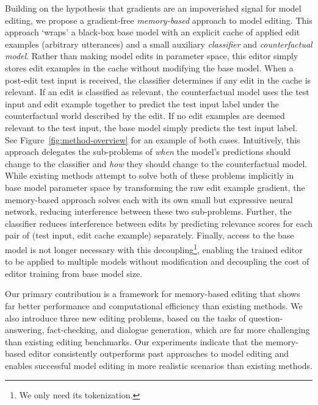 Building on the hypothesis that gradients are an impoverished signal for model editing, we propose a gradient-free \textit{memory-based} approach to model editing. This approach `wraps' a black-box base model with an explicit cache of applied edit examples
(arbitrary utterances)
and a small auxiliary \textit{classifier} and \textit{counterfactual model}. Rather than making model edits in parameter space, this editor simply stores edit examples in the cache without modifying the base model. When a post-edit test input is received, the classifier determines if any edit in the cache is relevant. If an edit is classified as relevant, the counterfactual model uses the test input and edit example together to predict the test input label under the counterfactual world described by the edit. If no edit examples are deemed relevant to the test input, the base model simply predicts the test input label. See Figure~\ref{fig:method-overview} for an example of both cases. Intuitively, this approach delegates the sub-problems of \textit{when} the model's predictions should change to the classifier and \textit{how} they should change to the counterfactual model. While existing methods attempt to solve both of these problems implicitly in base model parameter space by transforming the raw edit example gradient, the memory-based approach solves each with its own small but expressive neural network, reducing interference between these two sub-problems. Further, the classifier reduces interference between edits by predicting relevance scores for each pair of (test input, edit cache example) separately. Finally, access to the base model is not longer necessary with this decoupling\footnote{We only need its tokenization.}, enabling the trained editor to be applied to multiple models without modification and decoupling the cost of editor training from base model size.

Our primary contribution is a framework for memory-based editing that shows far better performance and computational efficiency than existing methods. We also introduce three new editing problems, based on the tasks of question-answering, fact-checking, and dialogue generation, which are far more challenging than existing editing benchmarks. Our experiments indicate that the memory-based editor consistently outperforms past approaches to model editing and enables successful model editing in more realistic scenarios than existing methods.

